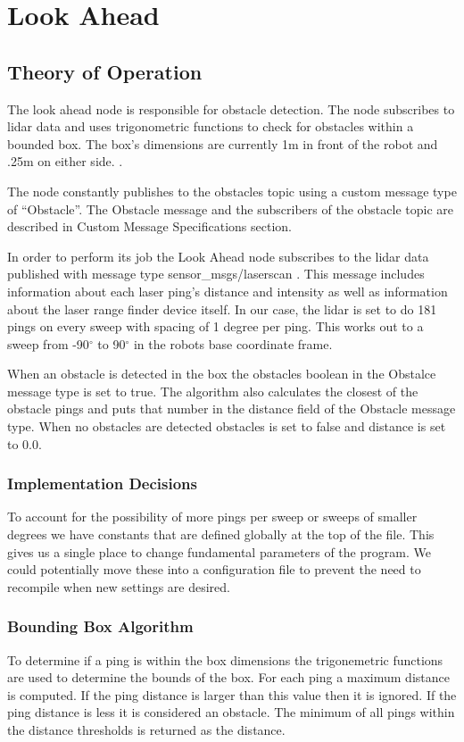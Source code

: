 \section{Look Ahead}
\subsection{Theory of Operation}

The look ahead node is responsible for obstacle detection. The node
subscribes to lidar data and uses trigonometric functions to check for
obstacles within a bounded box.  The box's dimensions are currently 1m
in front of the robot and .25m on either side. .

The node constantly publishes to the obstacles topic using a custom
message type of ``Obstacle''.  The Obstacle message and the
subscribers of the obstacle topic are described in Custom Message
Specifications section.

In order to perform its job the Look Ahead node subscribes to the
lidar data published with message type sensor\_msgs/laserscan
. This message
includes information about each laser ping's distance and intensity as
well as information about the laser range finder device itself.  In
our case, the lidar is set to do 181 pings on every sweep with spacing
of 1 degree per ping.  This works out to a sweep from -90$^\circ$ to
90$^\circ$ in the robots base coordinate frame.

When an obstacle is detected in the box the obstacles boolean in the
Obstalce message type is set to true. The algorithm also calculates
the closest of the obstacle pings and puts that number in the distance field
of the Obstacle message type. When no obstacles are detected obstacles
is set to false and distance is set to 0.0.

\subsubsection{Implementation Decisions}

To account for the possibility of more pings per sweep or sweeps of
smaller degrees we have constants that are defined globally at the top
of the file.  This gives us a single place to change fundamental
parameters of the program.  We could potentially move these into a
configuration file to prevent the need to recompile when new settings
are desired.

\subsubsection{Bounding Box Algorithm}
To determine if a ping is within the box dimensions the trigonemetric
functions are used to determine the bounds of the box.  For each ping
a maximum distance is computed.  If the ping distance is larger than this
value then it is ignored. If the ping distance is less it is
considered an obstacle.  The minimum of all pings within the distance
thresholds is returned as the distance.

